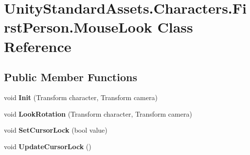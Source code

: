 \hypertarget{class_unity_standard_assets_1_1_characters_1_1_first_person_1_1_mouse_look}{}\section{Unity\+Standard\+Assets.\+Characters.\+First\+Person.\+Mouse\+Look Class Reference}
\label{class_unity_standard_assets_1_1_characters_1_1_first_person_1_1_mouse_look}
\subsection*{Public Member Functions}
\begin{DoxyCompactItemize}
\item 
\mbox{\label{class_unity_standard_assets_1_1_characters_1_1_first_person_1_1_mouse_look_a58d4b5ddd3ed33439f07c53f105bc502}} 
void {\bfseries Init} (Transform character, Transform camera)
\item 
\mbox{\label{class_unity_standard_assets_1_1_characters_1_1_first_person_1_1_mouse_look_a7ed8a0888bed66da925fcddf2be89c89}} 
void {\bfseries Look\+Rotation} (Transform character, Transform camera)
\item 
\mbox{\label{class_unity_standard_assets_1_1_characters_1_1_first_person_1_1_mouse_look_a75aaf639922c5206133f46fbc4207026}} 
void {\bfseries Set\+Cursor\+Lock} (bool value)
\item 
\mbox{\label{class_unity_standard_assets_1_1_characters_1_1_first_person_1_1_mouse_look_a511e6e031e69bc3206710e25674a3f5e}} 
void {\bfseries Update\+Cursor\+Lock} ()
\end{DoxyCompactItemize}
